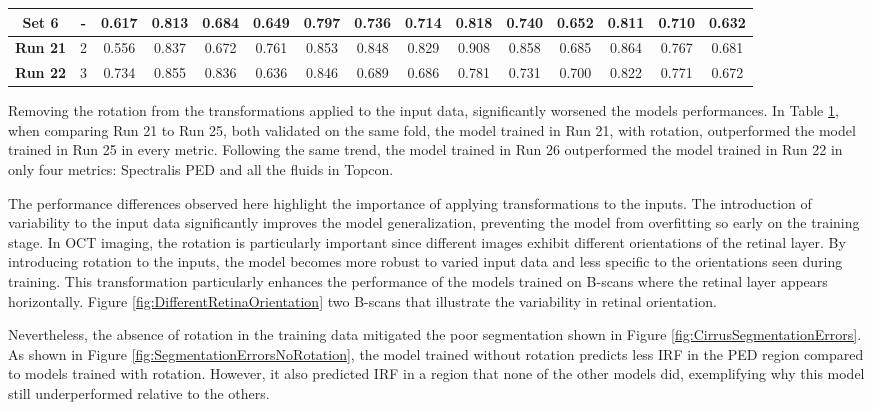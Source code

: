 \begin{table}
{\begin{tabular}{|c|c|ccc|ccc|ccc|c|c|c|c|}
			
			\hline
			
			\textbf{Set 6} & - & \multicolumn{1}{c|}{0.617} & \multicolumn{1}{c|}{0.813} & 0.684 & \multicolumn{1}{c|}{0.649} & \multicolumn{1}{c|}{0.797} & 0.736 & \multicolumn{1}{c|}{0.714} & \multicolumn{1}{c|}{0.818} & 0.740 & 0.652 & 0.811 & 0.710 & 0.632 \\
			
			\hline
			\hline
			
			\textbf{Run 21} & 2 & \multicolumn{1}{c|}{0.556} & \multicolumn{1}{c|}{0.837} & 0.672 & \multicolumn{1}{c|}{0.761} & \multicolumn{1}{c|}{0.853} & 0.848 & \multicolumn{1}{c|}{0.829} & \multicolumn{1}{c|}{0.908} & 0.858 & 0.685 & 0.864 & 0.767 & 0.681 \\
			
			\textbf{Run 22} & 3 & \multicolumn{1}{c|}{0.734} & \multicolumn{1}{c|}{0.855} & 0.836 & \multicolumn{1}{c|}{0.636} & \multicolumn{1}{c|}{0.846} & 0.689 & \multicolumn{1}{c|}{0.686} & \multicolumn{1}{c|}{0.781} & 0.731 & 0.700 & 0.822 & 0.771 & 0.672 \\
			
			\hline
			
	\end{tabular}}
	\label{tab:Experiment1.3SevenPatchesNoRotation}
\end{table}

Removing the rotation from the transformations applied to the input data, significantly worsened the models performances. In Table \ref{tab:Experiment1.3SevenPatchesNoRotation}, when comparing Run 21 to Run 25, both validated on the same fold, the model trained in Run 21, with rotation, outperformed the model trained in Run 25 in every metric. Following the same trend, the model trained in Run 26 outperformed the model trained in Run 22 in only four metrics: Spectralis PED and all the fluids in Topcon.
\par
The performance differences observed here highlight the importance of applying transformations to the inputs. The introduction of variability to the input data significantly improves the model generalization, preventing the model from overfitting so early on the training stage. In OCT imaging, the rotation is particularly important since different images exhibit different orientations of the retinal layer. By introducing rotation to the inputs, the model becomes more robust to varied input data and less specific to the orientations seen during training. This transformation particularly enhances the performance of the models trained on B-scans where the retinal layer appears horizontally. Figure \ref{fig:DifferentRetinaOrientation} two B-scans that illustrate the variability in retinal orientation.
\par
Nevertheless, the absence of rotation in the training data mitigated the poor segmentation shown in Figure \ref{fig:CirrusSegmentationErrors}. As shown in Figure \ref{fig:SegmentationErrorsNoRotation}, the model trained without rotation predicts less IRF in the PED region compared to models trained with rotation. However, it also predicted IRF in a region that none of the other models did, exemplifying why this model still underperformed relative to the others.


